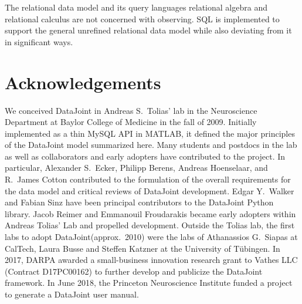 \documentclass[letter,10pt]{article}
\newcommand{\datajoint}{DataJoint\xspace}
\begin{document}
The relational data model and its query languages relational algebra and relational calculus are not concerned with observing. 
SQL is implemented to support the general unrefined relational data model while also deviating from it in significant ways. 

\section{Acknowledgements}
We conceived \datajoint in Andreas S.\ Tolias' lab in the Neuroscience Department at Baylor College of Medicine in the fall of 2009. 
Initially implemented as a thin MySQL API in MATLAB, it defined the major principles of the \datajoint model summarized here. 
Many students and postdocs in the lab as well as collaborators and early adopters have contributed to the project.
In particular, Alexander S.\ Ecker, Philipp Berens, Andreas Hoenselaar, and R.\ James Cotton contributed to the formulation of the overall requirements for the data model and critical reviews of \datajoint development.
Edgar Y.\ Walker and Fabian Sinz have been principal contributors to the \datajoint Python library. 
Jacob Reimer and Emmanouil Froudarakis became early adopters within Andreas Tolias' Lab and propelled development.
Outside the Tolias lab, the first labs to adopt \datajoint (approx.\ 2010) were the labs of Athanassios G.\ Siapas at CalTech, Laura Busse and Steffen Katzner at the University of T\"ubingen.
In 2017, DARPA awarded a small-business innovation research grant to Vathes LLC (Contract D17PC00162) to further develop and publicize the \datajoint framework. 
In June 2018, the Princeton Neuroscience Institute funded a project to generate a DataJoint user manual.  
\end{document}

